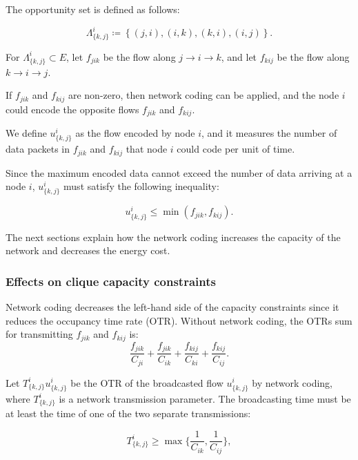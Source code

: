 The opportunity set is defined as follows:

\begin{equation}
    \Lambda^i_{\{k,j\}} \coloneqq \left \{(j,i),(i,k),(k,i),(i,j)\right \}.
\end{equation}

For \( \Lambda^i_{\{k,j\}} \subset E\), let \(f_{jik}\)  be the flow along  \(j \to i \to k\), and let \(f_{kij}\) be the flow along \(k \to i \to j\). 

If \(f_{jik}\) and \(f_{kij}\) are non-zero, then network coding can be applied, and the node \(i\) could encode the opposite flows \(f_{jik}\) and \(f_{kij}\).  

We define \(u^i_{\{k,j\}}\) as the flow encoded by node \(i\), and it measures the number of data packets in \(f_{jik}\) and \(f_{kij}\) that node \(i\) could code per unit of time.

Since the maximum encoded data cannot exceed the number of data arriving at a node \(i\),  \(u^i_{\{k,j\}}\) must satisfy the following inequality: 

\begin{equation}
\label{codineq}
u^i_{\{k,j\}} \le \min (f_{jik}, f_{kij}).
\end{equation}

 The next sections explain how the network coding increases the capacity of the network and decreases the energy cost.

\subsubsection{Effects on clique capacity constraints}\label{cliqueCapacity}

Network coding decreases the left-hand side of the capacity constraints since it reduces the occupancy time rate (OTR).
Without network coding, the OTRs sum for transmitting \(f_{jik}\) and \(f_{kij}\) is:\\
\begin{equation}
    \frac{f_{jik}}{C_{ji}}+ \frac{f_{jik}}{C_{ik}} +  \frac{f_{kij}}{C_{ki}}+ \frac{f_{kij}}{C_{ij}}.
\end{equation}

Let \(T^i_{\{k,j\}} u^i_{\{k,j\}}\) be the OTR of the broadcasted flow \(u^i_{\{k,j\}}\) by network coding,
where \(T^i_{\{k,j\}}\) is a network transmission parameter.
The broadcasting time must be at least the time of one of the two separate transmissions: 
  
  \begin{equation}
      T^i_{\{k,j\}} \ge \max \{\frac{1}{C_{ik}}, \frac{1}{C_{ij}}\},
  \end{equation}
 
